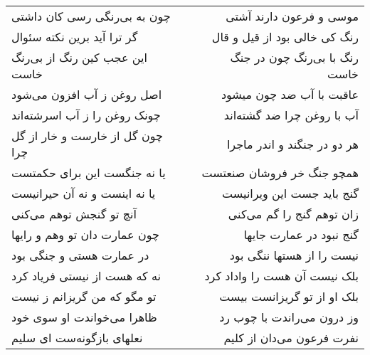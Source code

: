 \begin{center}
\begin{longtable}{l p{0.5cm} r}
چون به بی‌رنگی رسی کان داشتی
&&
موسی و فرعون دارند آشتی
\\
گر ترا آید برین نکته سئوال
&&
رنگ کی خالی بود از قیل و قال
\\
این عجب کین رنگ از بی‌رنگ خاست
&&
رنگ با بی‌رنگ چون در جنگ خاست
\\
اصل روغن ز آب افزون می‌شود
&&
عاقبت با آب ضد چون میشود
\\
چونک روغن را ز آب اسرشته‌اند
&&
آب با روغن چرا ضد گشته‌اند
\\
چون گل از خارست و خار از گل چرا
&&
هر دو در جنگند و اندر ماجرا
\\
یا نه جنگست این برای حکمتست
&&
همچو جنگ خر فروشان صنعتست
\\
یا نه اینست و نه آن حیرانیست
&&
گنج باید جست این ویرانیست
\\
آنچ تو گنجش توهم می‌کنی
&&
زان توهم گنج را گم می‌کنی
\\
چون عمارت دان تو وهم و رایها
&&
گنج نبود در عمارت جایها
\\
در عمارت هستی و جنگی بود
&&
نیست را از هستها ننگی بود
\\
نه که هست از نیستی فریاد کرد
&&
بلک نیست آن هست را واداد کرد
\\
تو مگو که من گریزانم ز نیست
&&
بلک او از تو گریزانست بیست
\\
ظاهرا می‌خواندت او سوی خود
&&
وز درون می‌راندت با چوب رد
\\
نعلهای بازگونه‌ست ای سلیم
&&
نفرت فرعون می‌دان از کلیم
\\
\end{longtable}
\end{center}
